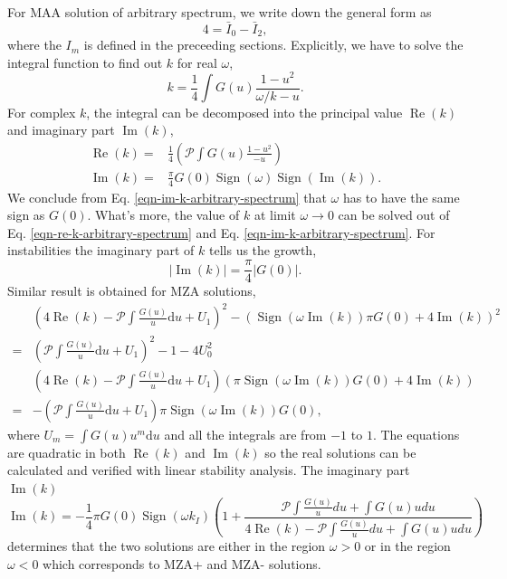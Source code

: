 \documentclass[%
preprint,
 amsmath,amssymb,
 aps,
 prd
]{revtex4-1}
\begin{document}
For MAA solution of arbitrary spectrum, we write down the general form as
\begin{equation}
   4 = \bar I_0 - \bar I_2,
\end{equation}
where the $I_m$ is defined in the preceeding sections. Explicitly, we have to solve the integral function to find out $k$ for real $\omega$,
\begin{equation}
   k = \frac{1}{4} \int G(u) \frac{ 1 - u^2 }{ \omega/k - u }.
\end{equation}
For complex $k$, the integral can be decomposed into the principal value $\operatorname{Re}(k)$ and imaginary part $\operatorname{Im}(k)$,
\begin{align}
\operatorname{Re}(k) =& \frac{1}{4}\left(  \mathcal{P} \int G(u) \frac{ 1 - u^2 }{  - u }  \right)\label{eqn-re-k-arbitrary-spectrum} \\
\operatorname{Im}(k) =&  \frac{\pi}{4}G(0) \operatorname{Sign}\left( \omega \right) \operatorname{Sign}\left(  \operatorname{Im}(k)  \right).
\label{eqn-im-k-arbitrary-spectrum}
\end{align}
We conclude from Eq. \eqref{eqn-im-k-arbitrary-spectrum} that $\omega$ has to have the same sign as $G(0)$. What's more, the value of $k$ at limit $\omega\to 0$ can be solved out of Eq. \eqref{eqn-re-k-arbitrary-spectrum} and Eq. \eqref{eqn-im-k-arbitrary-spectrum}. For instabilities the imaginary part of $k$ tells us the growth,
\begin{equation}
   \lvert \operatorname{Im}(k) \rvert  =  \frac{\pi}{4}\lvert G(0)\rvert .
\end{equation}
Similar result is obtained for MZA solutions,
\begin{align}
&\left(4\operatorname{Re}(k) - \mathcal P \int \frac{G(u)}{u} \mathrm d u + U_1 \right)^2  - \left( \operatorname{Sign}(\omega \operatorname{Im}(k) )\pi G(0) +4 \operatorname{Im}(k) \right)^2 \\
=&\left( \mathcal P \int \frac{G(u)}{u} \mathrm d u + U_1 \right)^2 -1 - 4 U_0^2  \\
&\left( 4 \operatorname{Re}(k) - \mathcal P \int \frac{G(u)}{u} \mathrm d u + U_1 \right) \left( \pi \operatorname{Sign}(\omega \operatorname{Im}(k) ) G(0) + 4 \operatorname{Im}(k) \right) \\
=& - \left( \mathcal P \int \frac{G(u)}{u} \mathrm du + U_1 \right) \pi \operatorname{Sign}(\omega \operatorname{Im}(k) ) G(0),
\end{align}
where $U_m = \int G(u) u^m \mathrm du$ and all the integrals are from $-1$ to $1$. The equations are quadratic in both $\operatorname{Re}(k)$ and $\operatorname{Im}(k)$ so the real solutions can be calculated and verified with linear stability analysis. The imaginary part $\operatorname{Im}(k)$
\begin{equation}
   \operatorname{Im}(k) = - \frac{1}{4} \pi G(0) \operatorname{Sign}(\omega k_I) \left(  1 + \frac{ \mathscr P \int \frac{G(u)}{u} du + \int G(u) u du }{ 4 \operatorname{Re}(k) - \mathscr P \int \frac{G(u)}{u} du + \int G(u) u du }  \right)
\end{equation}
determines that the two solutions are either in the region $\omega>0$ or in the region $\omega<0$ which corresponds to MZA+ and MZA- solutions.
\end{document}
